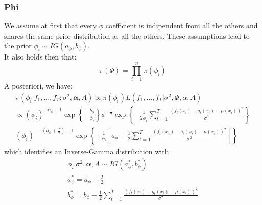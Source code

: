 \subsubsection{Phi}
We assume at first that every $\phi$ coefficient is indipendent from all the others and shares the same prior distribution as all the others. These assumptions lead to the prior $\phi_i \sim IG(a_\phi, b_\phi)$. \\
It also holds then that: 
\begin{equation}
    \pi(\Phi) = \prod_{i=1}^n \pi(\phi_i)
\end{equation}
A posteriori, we have: 
\begin{gather*}
    \pi(\phi_i | f_1, ..., f_T;  \sigma^2, \boldsymbol{\alpha}, A) \propto \pi(\phi_i)L(f_1, ..., f_T | \sigma^2, \Phi, \alpha, A) \\
    \propto (\phi_i)^{- \alpha_\phi - 1} \exp{\left \{ -\frac{b_\phi}{\phi_i} \right \}} \phi^{- \frac{T}{2}} \exp \left \{- \frac{1}{2 \phi_i} \sum_{t=1}^T \frac{(f_t(x_i) - g_t(x_i) - \mu(x_i))^2}{\sigma^2} \right\} \\
    (\phi_i)^{- {-(a_\phi + \frac{T}{2}) - 1}} \exp \left \{- \frac{1}{\phi_i} \left[a_\phi + \frac{1}{2} \sum_{t=1}^T \frac{(f_t(x_i) - g_t(x_i) - \mu(x_i))^2}{\sigma^2} \right] \right \}
\end{gather*}
which identifies an Inverse-Gamma distribution with 
\begin{gather*}
    \phi_i | \sigma^2, \boldsymbol{\alpha}, A \sim IG(a_\phi^*, b_\phi^*) \\
    a_\phi^* = a_\phi + \frac{T}{2} \\
    b_\phi^* = b_\phi + \frac{1}{2} \sum_{t=1}^T \frac{(f_t(x_i) - g_t(x_i) - \mu(x_i))^2}{\sigma^2}
\end{gather*}